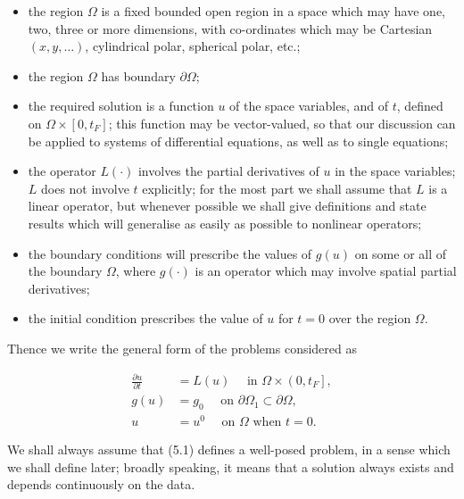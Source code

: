\documentclass[10pt]{article}
\begin{document}
\begin{itemize}
  \item the region \(\Omega\) is a fixed bounded open region in a space which may have one, two, three or more dimensions, with co-ordinates which may be Cartesian \((x, y, \ldots)\), cylindrical polar, spherical polar, etc.;
  \item the region \(\Omega\) has boundary \(\partial \Omega\);
  \item the required solution is a function \(u\) of the space variables, and of \(t\), defined on \(\Omega \times\left[0, t_{F}\right]\); this function may be vector-valued, so that our discussion can be applied to systems of differential equations, as well as to single equations;
  \item the operator \(L(\cdot)\) involves the partial derivatives of \(u\) in the space variables; \(L\) does not involve \(t\) explicitly; for the most part we shall assume that \(L\) is a linear operator, but whenever possible we shall give definitions and state results which will generalise as easily as possible to nonlinear operators;
  \item the boundary conditions will prescribe the values of \(g(u)\) on some or all of the boundary \(\Omega\), where \(g(\cdot)\) is an operator which may involve spatial partial derivatives;
  \item the initial condition prescribes the value of \(u\) for \(t=0\) over the region \(\Omega\).
\end{itemize}

Thence we write the general form of the problems considered as

\[
\begin{aligned}
\frac{\partial u}{\partial t} & =L(u) \quad \text { in } \Omega \times\left(0, t_{F}\right], \\
g(u) & =g_{0} \quad \text { on } \partial \Omega_{1} \subset \partial \Omega, \\
u & =u^{0} \quad \text { on } \Omega \text { when } t=0 .
\end{aligned}
\]

We shall always assume that (5.1) defines a well-posed problem, in a sense which we shall define later; broadly speaking, it means that a solution always exists and depends continuously on the data.
\end{document}

